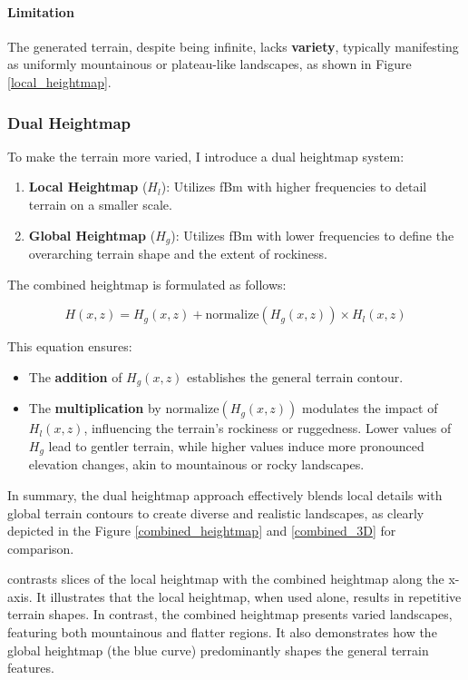 \paragraph{Limitation}
The generated terrain, despite being infinite, lacks \textbf{variety}, typically manifesting as uniformly mountainous or plateau-like landscapes, as shown in Figure \ref{local_heightmap}.


\subsubsection{Dual Heightmap}

To make the terrain more varied, I introduce a dual heightmap system:

\begin{enumerate}
    \item \textbf{Local Heightmap} ($H_{l}$): Utilizes fBm with higher frequencies to detail terrain on a smaller scale.
    \item \textbf{Global Heightmap} ($H_{g}$): Utilizes fBm with lower frequencies to define the overarching terrain shape and the extent of rockiness.
\end{enumerate}

The combined heightmap is formulated as follows:

\begin{equation}
H(x,z) = H_{g}(x,z) + \text{normalize}(H_{g}(x,z))\times H_{l}(x,z)
\end{equation}

This equation ensures:

\begin{itemize}
    \item The \textbf{addition} of $H_{g}(x,z)$ establishes the general terrain contour.
    \item The \textbf{multiplication} by $\text{normalize}(H_{g}(x,z))$ modulates the impact of $H_{l}(x,z)$, influencing the terrain's rockiness or ruggedness. Lower values of $H_{g}$ lead to gentler terrain, while higher values induce more pronounced elevation changes, akin to mountainous or rocky landscapes.
\end{itemize}

In summary, the dual heightmap approach effectively blends local details with global terrain contours to create diverse and realistic landscapes, as clearly depicted in the Figure \ref{combined_heightmap} and \ref{combined_3D} for comparison.

{contrasts slices of the local heightmap with the combined heightmap along the x-axis. It illustrates that the local heightmap, when used alone, results in repetitive terrain shapes. In contrast, the combined heightmap presents varied landscapes, featuring both mountainous and flatter regions. It also demonstrates how the global heightmap (the blue curve) predominantly shapes the general terrain features.}

